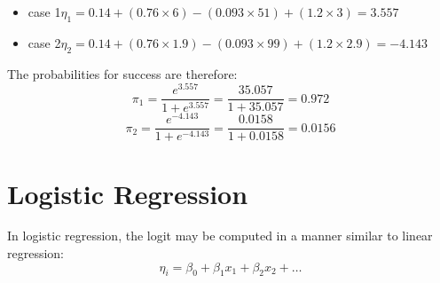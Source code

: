 \documentclass[12pt, a4paper]{article}
\theoremstyle{plain}
\theoremstyle{definition}
\theoremstyle{remark}
\begin{document}
\begin{itemize}
	\item case 1$ \eta_1 = 0.14 + (0.76 \times 6)	- (0.093\times 51) + (1.2\times 3) = 3.557$
	\item case 2$ \eta_2 = 0.14 + (0.76 \times 1.9)	- (0.093\times 99) + (1.2\times 2.9) = -4.143$
\end{itemize}

The probabilities for success are therefore:
\[ \pi_1  =  \frac{e^{3.557}}{1 + e^{3.557}} = \frac{35.057}{1 + 35.057} = 0.972 \]
\[ \pi_2  =  \frac{e^{-4.143}}{1 + e^{-4.143}} = \frac{0.0158}{1 + 0.0158} = 0.0156 \]


\section{Logistic Regression}
In logistic regression, the logit may be computed in a manner similar to linear regression:
\[ \eta_i = \beta_0 + \beta_1x_1 + \beta_2x_2 + \ldots  \]

\end{document}
